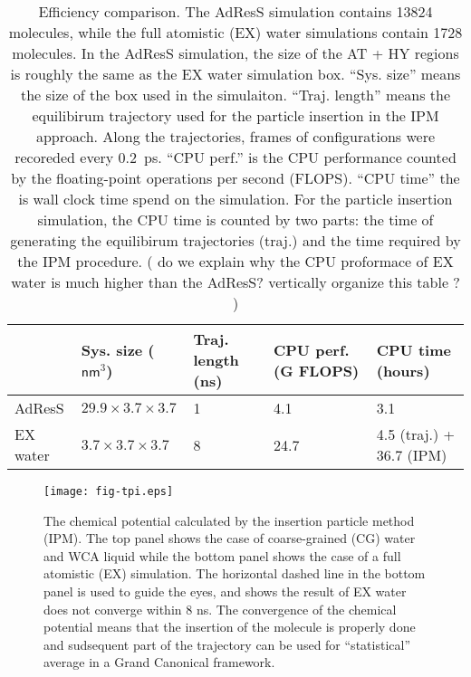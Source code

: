 \documentclass[aip,jcp,a4paper,reprint,onecolumn]{revtex4-1}
\newcommand{\redc}[1]{{\color{red} #1}}
\newcommand{\bluec}[1]{{\color{blue} #1}}
\begin{document}
\begin{table}
  \centering
  \begin{tabular}{l|l|l|l|l}
    & Sys. size ($\textsf{nm}^3$)
    & Traj. length (\textsf{ns})
    & CPU perf. (G FLOPS)
    & CPU time (hours)\\    \hline
    AdResS   &$29.9\times3.7\times3.7$ & 1 &  4.1 & 3.1\\
    EX water & $3.7\times3.7\times3.7$ & 8 & 24.7 & 4.5 (traj.) + 36.7 (IPM)\\
  \end{tabular}
  \caption{\redc{\bluec{Efficiency comparison}.
      The AdResS simulation contains 13824 molecules, while the
      \bluec{full atomistic (EX)}
      water simulations contain 1728 molecules. In the AdResS simulation,
      the size of the AT + HY regions is roughly the same as the EX water
      simulation box.
      ``Sys. size'' means the size of the box used in the simulaiton.
      ``Traj. length'' means the equilibirum trajectory
      used for the particle insertion in the IPM approach. Along the trajectories, frames
      of configurations were recoreded every 0.2~\textsf{ps}.
      ``CPU perf.'' is the CPU performance
      counted by the floating-point operations per second (FLOPS).
      ``CPU time'' the is wall clock time spend on the simulation.
      For the particle insertion simulation, the CPU time is counted by two
      parts: the time of generating the equilibirum trajectories (traj.)
      and the time required by the IPM procedure.
    }
    \bluec{
      ( do we explain why the CPU proformace of EX water is much higher than
      the AdResS? vertically organize this table ? )}
  }
  \label{tab:tmp1}
\end{table}
\begin{figure}
  \centering
  \texttt{[image: fig-tpi.eps]}
  \caption{\redc{The chemical potential calculated by the \bluec{insertion particle method (IPM)}. The top panel shows the case of coarse-grained (CG) water and WCA liquid while the bottom panel shows the case of a full atomistic (EX) simulation.
      \bluec{
        The horizontal dashed line in the bottom panel
        is used to guide the eyes, and shows
        the result of EX water does not converge within 8 \textsf{ns}.
      }
      The convergence of the chemical potential means that the insertion of the molecule is properly done and sudsequent part of the trajectory can be used for ``statistical'' average in a Grand Canonical framework.}}
  \label{fig:tmp4}
\end{figure}
\end{document}
